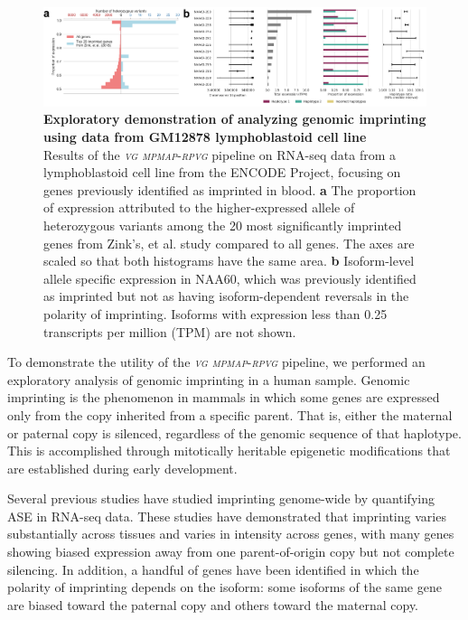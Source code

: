 \documentclass[11pt]{ucthesis}
\newcommand{\tool}[1]{\emph{\textsc{#1}}}
\begin{document}
\begin{figure}[h]
\ssp
\begin{center}
\includegraphics[width=\textwidth]{mpmapfigures/figure4.pdf}
\caption{\textbf{Exploratory demonstration of analyzing genomic imprinting using data from GM12878 lymphoblastoid cell line} \\
Results of the \tool{vg mpmap}-\tool{rpvg} pipeline on RNA-seq data from a lymphoblastoid cell line from the ENCODE Project, focusing on genes previously identified as imprinted in blood. \textbf{a} The proportion of expression attributed to the higher-expressed allele of heterozygous variants among the 20 most significantly imprinted genes from Zink's, et al. study \cite{zink2018insights} compared to all genes. The axes are scaled so that both histograms have the same area. \textbf{b} Isoform-level allele specific expression in NAA60, which was previously identified as imprinted but not as having isoform-dependent reversals in the polarity of imprinting\cite{zink2018insights}. Isoforms with expression less than 0.25 transcripts per million (TPM) are not shown.
} \label{fig:imprinting}
\end{center}
\end{figure}

To demonstrate the utility of the \tool{vg mpmap}-\tool{rpvg} pipeline, we performed an exploratory analysis of genomic imprinting in a human sample. Genomic imprinting is the phenomenon in mammals in which some genes are expressed only from the copy inherited from a specific parent. That is, either the maternal or paternal copy is silenced, regardless of the genomic sequence of that haplotype. This is accomplished through mitotically heritable epigenetic modifications that are established during early development\cite{tucci2019genomic}.

Several previous studies have studied imprinting genome-wide by quantifying ASE in RNA-seq data. These studies have demonstrated that imprinting varies substantially across tissues \cite{baran2015landscape,babak2015genetic} and varies in intensity across genes, with many genes showing biased expression away from one parent-of-origin copy but not complete silencing\cite{babak2015genetic,jadhav2019rna,zink2018insights}. In addition, a handful of genes have been identified in which the polarity of imprinting depends on the isoform: some isoforms of the same gene are biased toward the paternal copy and others toward the maternal copy\cite{zink2018insights}.
\end{document}

